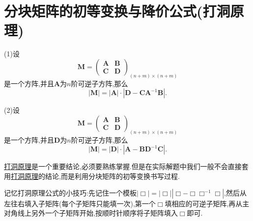 \documentclass[../../main.tex]{subfiles}
\begin{document}
\section{分块矩阵的初等变换与降价公式(打洞原理)}

\begin{proposition}[打洞原理]\label{proposition:打洞原理}
(1)设
\[
\boldsymbol{M} = 
\begin{pmatrix}
\boldsymbol{A} & \boldsymbol{B} \\
\boldsymbol{C} & \boldsymbol{D}
\end{pmatrix}_{(n + m) \times (n + m)}
\]
是一个方阵,并且\(\boldsymbol{A}\)为\(n\)阶可逆子方阵,那么
\[
|\boldsymbol{M}| = |\boldsymbol{A}| \cdot |\boldsymbol{D} - \boldsymbol{C}\boldsymbol{A}^{-1}\boldsymbol{B}|.
\]

(2)设
\[
\boldsymbol{M} = 
\begin{pmatrix}
\boldsymbol{A} & \boldsymbol{B} \\
\boldsymbol{C} & \boldsymbol{D}
\end{pmatrix}_{(n + m) \times (n + m)}
\]
是一个方阵,并且\(\boldsymbol{D}\)为\(n\)阶可逆子方阵,那么
\[
|\boldsymbol{M}| = |\boldsymbol{D}| \cdot |\boldsymbol{A} - \boldsymbol{B}\boldsymbol{D}^{-1}\boldsymbol{C}|.
\]
\end{proposition}
\begin{note}
\hyperref[proposition:打洞原理]{打洞原理}是一个重要结论,必须要熟练掌握.但是在实际解题中我们一般不会直接套用\hyperref[proposition:打洞原理]{打洞原理}的结论,而是利用分块矩阵的初等变换书写过程.

记忆打洞原理公式的小技巧:先记住一个模板$\left| \Box \right|=\left| \Box \right|\left| \Box -\Box \Box ^{-1}\Box \right|$,然后从左往右填入子矩阵(每个子矩阵只能填一次),第一个$\Box$填相应的可逆子矩阵,再从主对角线上另外一个子矩阵开始,按顺时针顺序将子矩阵填入$\Box$即可.
\end{note}
\end{document}
